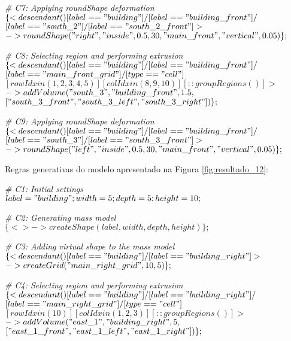 \noindent \textit{\# C7: Applying roundShape deformation}\\
$\{< descendant() [label=="building"] / [label=="building\_front"] / $\\
$[label=="south\_2"] / [label=="south\_2\_front"] > $\\
$-> roundShape("right", "inside", 0.5, 30, "main\_front", "vertical", 0.05)\};$

\noindent \textit{\# C8: Selecting region and performing extrusion}\\
$\{< descendant() [label=="building"] / [label=="building\_front"] / $\\
$[label=="main\_front\_grid"] / [type=="cell"] $\\
$[rowIdx in (1, 2, 3, 4, 5)] [colIdx in (8, 9, 10)] [::groupRegions()] > $\\
$-> addVolume("south\_3", "building\_front", 1.5, $\\
$["south\_3\_front", "south\_3\_left", "south\_3\_right"])\};$

\noindent \textit{\# C9: Applying roundShape deformation}\\
$\{< descendant() [label=="building"] / [label=="building\_front"] / $\\
$[label=="south\_3"] / [label=="south\_3\_front"] > $\\
$-> roundShape("left", "inside", 0.5, 30, "main\_front", "vertical", 0.05)\};$

\vspace{1cm}

Regras generativas do modelo apresentado na Figura \ref{fig:resultado_12}:

\noindent \textit{\# C1: Initial settings}\\
$label = "building"; width = 5; depth = 5; height = 10;$

\noindent \textit{\# C2: Generating mass model}\\
$\{<> -> createShape(label, width, depth, height)\};$

\noindent \textit{\# C3: Adding virtual shape to the mass model}\\
$\{< descendant() [label=="building"] / [label=="building\_right"] > $\\
$-> createGrid("main\_right\_grid", 10, 5)\};$

\noindent \textit{\# C4: Selecting region and performing extrusion}\\
$\{< descendant() [label=="building"] / [label=="building\_right"] / $\\
$[label=="main\_right\_grid"] / [type=="cell"] $\\
$[rowIdx in (10)] [colIdx in (1, 2, 3)] [::groupRegions()] > $\\
$-> addVolume("east\_1", "building\_right", 5, $\\
$["east\_1\_front", "east\_1\_left", "east\_1\_right"])\};$

